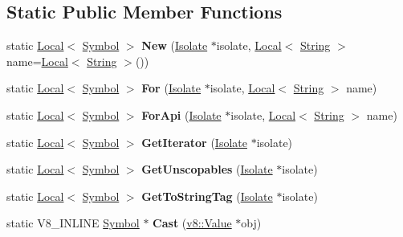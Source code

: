\subsection*{Static Public Member Functions}
\begin{DoxyCompactItemize}
\item 
\hypertarget{classv8_1_1Symbol_add1f6084974464105b56595d34c14ab9}{}static \hyperlink{classv8_1_1Local}{Local}$<$ \hyperlink{classv8_1_1Symbol}{Symbol} $>$ {\bfseries New} (\hyperlink{classv8_1_1Isolate}{Isolate} $\ast$isolate, \hyperlink{classv8_1_1Local}{Local}$<$ \hyperlink{classv8_1_1String}{String} $>$ name=\hyperlink{classv8_1_1Local}{Local}$<$ \hyperlink{classv8_1_1String}{String} $>$())\label{classv8_1_1Symbol_add1f6084974464105b56595d34c14ab9}

\item 
\hypertarget{classv8_1_1Symbol_a8a4a6bdc7d3e31c71cf48fa5cb811fc8}{}static \hyperlink{classv8_1_1Local}{Local}$<$ \hyperlink{classv8_1_1Symbol}{Symbol} $>$ {\bfseries For} (\hyperlink{classv8_1_1Isolate}{Isolate} $\ast$isolate, \hyperlink{classv8_1_1Local}{Local}$<$ \hyperlink{classv8_1_1String}{String} $>$ name)\label{classv8_1_1Symbol_a8a4a6bdc7d3e31c71cf48fa5cb811fc8}

\item 
\hypertarget{classv8_1_1Symbol_ac3937f0b0b831c4be495a399f26d7301}{}static \hyperlink{classv8_1_1Local}{Local}$<$ \hyperlink{classv8_1_1Symbol}{Symbol} $>$ {\bfseries For\+Api} (\hyperlink{classv8_1_1Isolate}{Isolate} $\ast$isolate, \hyperlink{classv8_1_1Local}{Local}$<$ \hyperlink{classv8_1_1String}{String} $>$ name)\label{classv8_1_1Symbol_ac3937f0b0b831c4be495a399f26d7301}

\item 
\hypertarget{classv8_1_1Symbol_a35aa1aca7135c5bf9052d8d067d126b1}{}static \hyperlink{classv8_1_1Local}{Local}$<$ \hyperlink{classv8_1_1Symbol}{Symbol} $>$ {\bfseries Get\+Iterator} (\hyperlink{classv8_1_1Isolate}{Isolate} $\ast$isolate)\label{classv8_1_1Symbol_a35aa1aca7135c5bf9052d8d067d126b1}

\item 
\hypertarget{classv8_1_1Symbol_acf5b5220a820f6ed1e61500292ebec13}{}static \hyperlink{classv8_1_1Local}{Local}$<$ \hyperlink{classv8_1_1Symbol}{Symbol} $>$ {\bfseries Get\+Unscopables} (\hyperlink{classv8_1_1Isolate}{Isolate} $\ast$isolate)\label{classv8_1_1Symbol_acf5b5220a820f6ed1e61500292ebec13}

\item 
\hypertarget{classv8_1_1Symbol_ab595ae7100ce23e4b1677ecab02f5972}{}static \hyperlink{classv8_1_1Local}{Local}$<$ \hyperlink{classv8_1_1Symbol}{Symbol} $>$ {\bfseries Get\+To\+String\+Tag} (\hyperlink{classv8_1_1Isolate}{Isolate} $\ast$isolate)\label{classv8_1_1Symbol_ab595ae7100ce23e4b1677ecab02f5972}

\item 
\hypertarget{classv8_1_1Symbol_a6bb214df5e2d8655379a648530aebaf1}{}static V8\+\_\+\+I\+N\+L\+I\+N\+E \hyperlink{classv8_1_1Symbol}{Symbol} $\ast$ {\bfseries Cast} (\hyperlink{classv8_1_1Value}{v8\+::\+Value} $\ast$obj)\label{classv8_1_1Symbol_a6bb214df5e2d8655379a648530aebaf1}

\end{DoxyCompactItemize}


